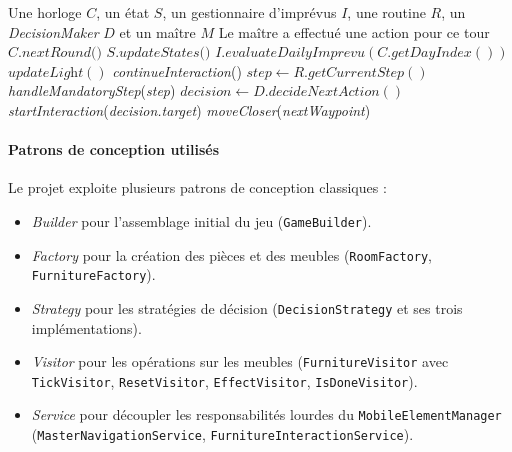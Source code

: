 \begin{algorithm}
\caption{Tour de simulation : \textit{nextRound}}
\label{algo:tour}
\begin{algorithmic}
\REQUIRE Une horloge $C$, un état $S$, un gestionnaire d'imprévus $I$, une routine $R$, un \textit{DecisionMaker} $D$ et un maître $M$
\ENSURE Le maître a effectué une action pour ce tour
\STATE $C.\textit{nextRound()}$
\STATE $S.\textit{updateStates()}$
\STATE $I.\textit{evaluateDailyImprevu}(C.\textit{getDayIndex}())$
\STATE $\textit{updateLight}()$
\STATE \textit{continueInteraction}()
\RETURN
\ENDIF
\STATE $\textit{step} \leftarrow R.\textit{getCurrentStep}()$
\STATE \textit{handleMandatoryStep}(\textit{step})
\RETURN
\ENDIF
{}
\STATE $\textit{decision} \leftarrow D.\textit{decideNextAction}()$
\STATE \textit{startInteraction}(\textit{decision.target})
\ELSE
\STATE \textit{moveCloser}(\textit{nextWaypoint})
\ENDIF
\ENDIF
\ENDIF
\end{algorithmic}
\end{algorithm}

\paragraph{Patrons de conception utilisés} Le projet exploite plusieurs patrons de conception classiques :
\begin{itemize}
\item \textit{Builder} pour l'assemblage initial du jeu (\texttt{GameBuilder}).
\item \textit{Factory} pour la création des pièces et des meubles (\texttt{RoomFactory}, \texttt{FurnitureFactory}).
\item \textit{Strategy} pour les stratégies de décision (\texttt{DecisionStrategy} et ses trois implémentations).
\item \textit{Visitor} pour les opérations sur les meubles (\texttt{FurnitureVisitor} avec \texttt{TickVisitor}, \texttt{ResetVisitor}, \texttt{EffectVisitor}, \texttt{IsDoneVisitor}).
\item \textit{Service} pour découpler les responsabilités lourdes du \texttt{MobileElementManager} (\texttt{MasterNavigationService}, \texttt{FurnitureInteractionService}).
\end{itemize}
